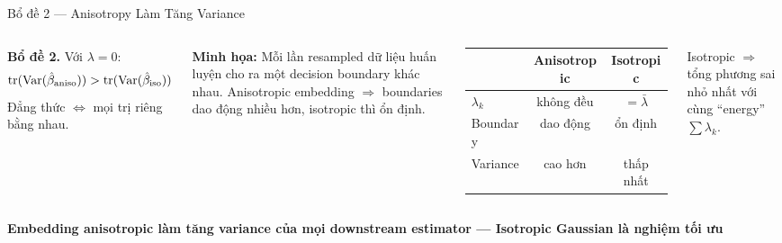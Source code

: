 \documentclass[aspectratio=169,9pt]{beamer}
\newcommand{\takeaway}[1]{%
  \vfill
  \begin{mdframed}[
    linecolor=maccent, linewidth=1.5pt,
    backgroundcolor=mlightgold,
    innertopmargin=5pt, innerbottommargin=5pt,
    innerleftmargin=10pt, innerrightmargin=10pt,
    roundcorner=3pt, skipabove=4pt, skipbelow=0pt
  ]
  \centering\small\bfseries\color{mprimary} #1
  \end{mdframed}%
}
\begin{document}
\begin{frame}{Bổ đề 2 — Anisotropy Làm Tăng Variance}
\begin{columns}[T]
\vspace{0.4em}
\begin{primarybox}
\footnotesize\textbf{Bổ đề 2.} Với $\lambda=0$:
\[
  \mathrm{tr}(\mathrm{Var}(\hat\beta_{\rm aniso})) > \mathrm{tr}(\mathrm{Var}(\hat\beta_{\rm iso}))
\]
Đẳng thức $\Leftrightarrow$ mọi trị riêng bằng nhau.
\end{primarybox}

\vspace{0.5em}

\textbf{Minh họa:} Mỗi lần resampled dữ liệu huấn luyện cho ra một decision boundary khác nhau. Anisotropic embedding $\Rightarrow$ boundaries dao động nhiều hơn, isotropic thì ổn định.

\vspace{0.8em}
\begin{tabular}{@{}lcc@{}}
\toprule
 & Anisotropic & Isotropic \\
\midrule
$\lambda_k$ & không đều & $= \bar\lambda$ \\
Boundary & \textcolor{mbad}{dao động} & \textcolor{mgood}{ổn định} \\
Variance & \textcolor{mbad}{cao hơn} & \textcolor{mgood}{thấp nhất} \\
\bottomrule
\end{tabular}

\vspace{0.7em}
\begin{goodbox}
\footnotesize Isotropic $\Rightarrow$ tổng phương sai nhỏ nhất với cùng ``energy'' $\sum\lambda_k$.
\end{goodbox}

\end{columns}

\takeaway{Embedding anisotropic làm tăng variance của mọi downstream estimator — Isotropic Gaussian là nghiệm tối ưu}

\end{frame}
\end{document}
